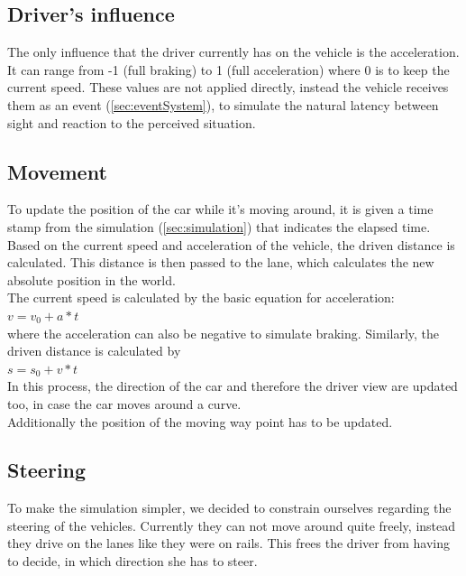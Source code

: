 \subsection{Driver's influence}
\label{sec:driverInfluence}

The only influence that the driver currently has on the vehicle is the 
acceleration. It can range from -1 (full braking) to 1 (full acceleration)
where 0 is to keep the current speed. These values are not applied directly,
instead the vehicle receives them as an event (\ref{sec:eventSystem}), to 
simulate the natural latency between sight and reaction to the perceived 
situation.

\subsection{Movement}

To update the position of the car while it's moving around, it is given
a time stamp from the simulation (\ref{sec:simulation}) that indicates 
the elapsed time. Based on the current speed and acceleration of the 
vehicle, the driven distance is calculated. This distance is then passed
to the lane, which calculates the new absolute position in the world. \\

\noindent The current speed is calculated by the basic equation for
acceleration: \\

$ v = v_0 + a * t$ \\

\noindent where the acceleration can also be negative to simulate braking.
Similarly, the driven distance is calculated by \\

$ s = s_0 + v * t $ \\

\noindent In this process, the direction of the car and therefore the driver
view are updated too, in case the car moves around a curve. \\

\noindent Additionally the position of the moving way point has to be updated.

\subsection{Steering}
\label{sec:steering}

To make the simulation simpler, we decided to constrain ourselves regarding
the steering of the vehicles. Currently they can not move around quite freely, 
instead they drive on the lanes like they were on rails. This frees the 
driver from having to decide, in which direction she has to steer.

